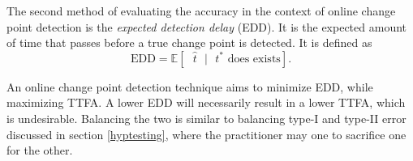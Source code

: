 The second method of evaluating the accuracy in the context of online change point detection is the \textit{expected detection delay} (EDD). It is the expected amount of time that passes before a true change point is detected. It is defined as 
\begin{equation}
\label{edd}
\text{EDD} = \mathbb{E}[\text{ }  \hat{t} \text{ } |\text{ }  t^* \text{ does exists} ].
\end{equation}

An online change point detection technique aims to minimize EDD, while maximizing TTFA. A lower EDD will necessarily result in a lower TTFA, which is undesirable. Balancing the two is similar to balancing type-I and type-II error discussed in section \ref{hyptesting}, where the practitioner may one to sacrifice one for the other.







